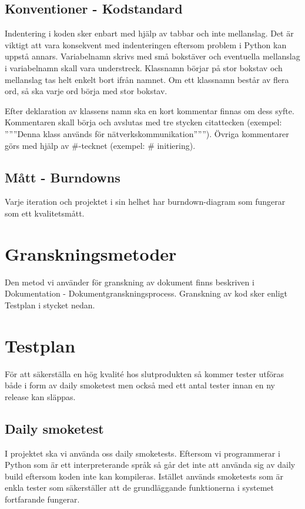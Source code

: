 \subsection{Konventioner - Kodstandard}
Indentering i koden sker enbart med hjälp av tabbar och inte mellanslag. Det är viktigt att vara konsekvent med indenteringen eftersom problem i Python kan uppstå annars. Variabelnamn skrivs med små bokstäver och eventuella mellanslag i variabelnamn skall vara understreck. Klassnamn börjar på stor bokstav och mellanslag tas helt enkelt bort ifrån namnet. Om ett klassnamn består av flera ord, så ska varje ord börja med stor bokstav.

Efter deklaration av klassens namn ska en kort kommentar finnas om dess syfte. Kommentaren skall börja och avslutas med tre stycken citattecken (exempel: ''''''Denna klass används för nätverkskommunikation''''''). Övriga kommentarer görs med hjälp av \#-tecknet (exempel: \# initiering).

\subsection{Mått - Burndowns}
Varje iteration och projektet i sin helhet har burndown-diagram som fungerar som ett kvalitetsmått. 

\section{Granskningsmetoder}
Den metod vi använder för granskning av dokument finns beskriven i Dokumentation - Dokumentgranskningsprocess. Granskning av kod sker enligt Testplan i stycket nedan.

\section{Testplan}
För att säkerställa en hög kvalité hos slutprodukten så kommer tester utföras både i form av daily smoketest men också med ett antal tester innan en ny release kan släppas.

\subsection{Daily smoketest}
I projektet ska vi använda oss daily smoketests. Eftersom vi programmerar i Python som är ett interpreterande språk så går det inte att använda sig av daily build eftersom koden inte kan kompileras. Istället används smoketests som är enkla tester som säkerställer att de grundläggande funktionerna i systemet fortfarande fungerar. 

